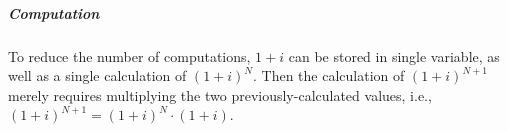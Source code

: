 \subparagraph{Computation}
To reduce the number of computations, $1+i$ can be stored in 
single variable, as well as a single calculation of $(1+i)^N$.
Then the calculation of $(1+i)^{N+1}$ merely requires multiplying the two
previously-calculated values, i.e., $(1+i)^{N+1} = (1+i)^N \cdot (1+i)$.


